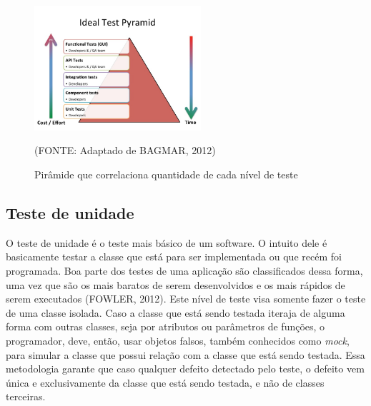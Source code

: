 \documentclass[
    12pt,       %
    openright,      %
    twoside,      %
    a4paper,      %
    english,      %
    french,       %
    spanish,      %
    brazil,       %
    ]{abntex2}
\begin{document}
          \begin{figure}[!htb]
              \begin{center}
                  \includegraphics[width=0.55\textwidth]{img/pyramid.jpg}
              \end{center}
              \caption{\label{fig:passaro}Pirâmide que correlaciona quantidade de cada nível de teste}
              \begin{center}(FONTE: Adaptado de BAGMAR, 2012)\end{center}
          \end{figure}

          \subsection{Teste de unidade}
              O teste de unidade é o teste mais básico de um software. O intuito dele é basicamente
              testar a classe que está para ser implementada ou que recém foi programada. Boa
              parte dos testes de uma aplicação são classificados dessa forma, uma vez que são
              os mais baratos de serem desenvolvidos e os mais rápidos de serem executados (FOWLER, 2012).
              Este nível de teste visa somente fazer o teste de uma classe isolada. Caso a classe
              que está sendo testada iteraja de alguma forma com outras classes, seja por atributos
              ou parâmetros de funções, o programador, deve, então, usar objetos falsos, também
              conhecidos como \textit{mock}, para simular a classe que possui relação com a classe
              que está sendo testada. Essa metodologia garante que caso qualquer defeito detectado
              pelo teste, o defeito vem única e exclusivamente da classe que está sendo testada,
              e não de classes terceiras.
\end{document}
